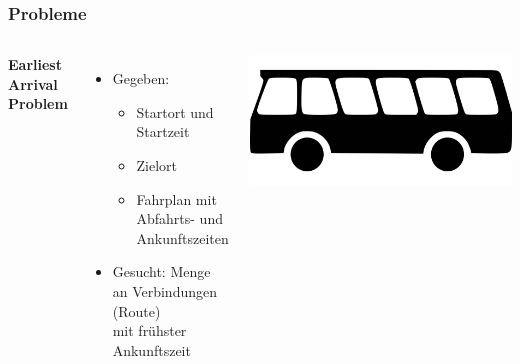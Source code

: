 \documentclass[aspectratio=169]{beamer}
\begin{document}
\begin{frame}
\frametitle{Probleme}
\begin{columns}[c] %
	
	\textbf{Earliest Arrival Problem}
	\begin{itemize}
		\item Gegeben:
		\begin{itemize}
			\item Startort und Startzeit
			\item Zielort
			\item Fahrplan mit Abfahrts- und Ankunftszeiten
		\end{itemize}
		\item Gesucht: Menge an Verbindungen (Route) \\ mit frühster Ankunftszeit
	\end{itemize}
	\includegraphics[scale=0.2]{bus.png}	
\end{columns}
\end{frame}

\end{document}
